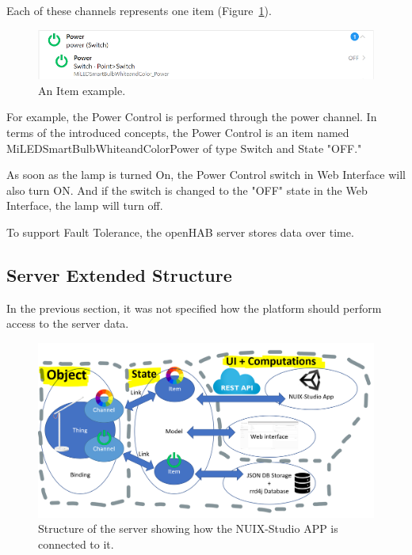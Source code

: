 Each of these channels represents one item (Figure~\ref{fig:XiaomiLampPowerItem-figure}).

\begin{figure}
  \centering
  \includegraphics[width=0.9\linewidth]{figures/XiaomiLampPowerItem.png}
  \caption{An Item example.}
  \label{fig:XiaomiLampPowerItem-figure}
\end{figure}

For example, the Power Control is performed through the power channel. In terms of the introduced concepts, the Power Control is an item named MiLEDSmartBulbWhiteandColorPower of type Switch and State "OFF."

As soon as the lamp is turned On, the Power Control switch in Web Interface will also turn ON. And if the switch is changed to the "OFF" state in the Web Interface, the lamp will turn off.

To support Fault Tolerance, the openHAB server stores data over time.

\subsection{Server Extended Structure}

In the previous section, it was not specified how the platform should perform access to the server data. 

\begin{figure}
  \centering
  \includegraphics[width=0.9\linewidth]{figures/ExtendedServerStructure.png}
  \caption{Structure of the server showing how the NUIX-Studio APP is connected to it.}
  \label{fig:ExtendedServerStructure-figure}
\end{figure}

